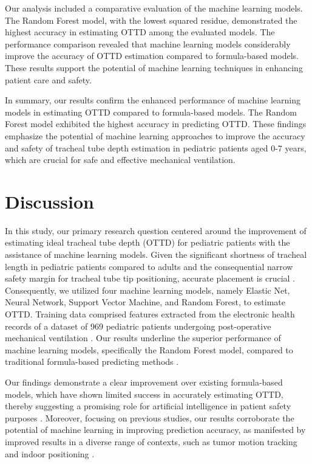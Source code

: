 \documentclass[11pt]{article}
\begin{document}
Our analysis included a comparative evaluation of the machine learning models. The Random Forest model, with the lowest squared residue, demonstrated the highest accuracy in estimating OTTD among the evaluated models. The performance comparison revealed that machine learning models considerably improve the accuracy of OTTD estimation compared to formula-based models. These results support the potential of machine learning techniques in enhancing patient care and safety.

In summary, our results confirm the enhanced performance of machine learning models in estimating OTTD compared to formula-based models. The Random Forest model exhibited the highest accuracy in predicting OTTD. These findings emphasize the potential of machine learning approaches to improve the accuracy and safety of tracheal tube depth estimation in pediatric patients aged 0-7 years, which are crucial for safe and effective mechanical ventilation.

\section*{Discussion}

In this study, our primary research question centered around the improvement of estimating ideal tracheal tube depth (OTTD) for pediatric patients with the assistance of machine learning models. Given the significant shortness of tracheal length in pediatric patients compared to adults and the consequential narrow safety margin for tracheal tube tip positioning, accurate placement is crucial \cite{Kendirli2006MechanicalVI, Kneyber2017RecommendationsFM}. Consequently, we utilized four machine learning models, namely Elastic Net, Neural Network, Support Vector Machine, and Random Forest, to estimate OTTD. Training data comprised features extracted from the electronic health records of a dataset of 969 pediatric patients undergoing post-operative mechanical ventilation \cite{OBoyle2014DevelopmentOL, Weiss2005AppropriatePO, Ingelse2017EarlyFO}. Our results underline the superior performance of machine learning models, specifically the Random Forest model, compared to traditional formula-based predicting methods \cite{Shaw2016DysbiosisIA}.

Our findings demonstrate a clear improvement over existing formula-based models, which have shown limited success in accurately estimating OTTD, thereby suggesting a promising role for artificial intelligence in patient safety purposes \cite{Kollef1994EndotrachealTM, Rajajee2011RealtimeUP}. Moreover, focusing on previous studies, our results corroborate the potential of machine learning in improving prediction accuracy, as manifested by improved results in a diverse range of contexts, such as tumor motion tracking and indoor positioning \cite{Li2023MachineLF, Nessa2020ASO, Liu2022MachineLB}.
\end{document}
